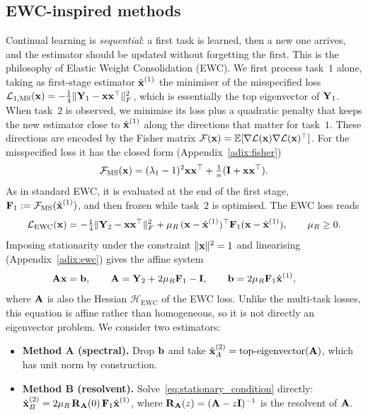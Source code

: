 \subsection{EWC-inspired methods}\label{sec:ewc}
Continual learning is \emph{sequential}: a first task is learned, then a new one arrives, and the estimator should be updated without forgetting the first. This is the philosophy of Elastic Weight Consolidation (EWC). We first process task~$1$ alone, taking as first-stage estimator $\hat{\boldsymbol{\mathbf{x}}}^{(1)}$ the minimiser of the misspecified loss $\mathcal L_{1,\mathrm{MS}}(\boldsymbol{\mathbf{x}}) = -\tfrac14 \|\boldsymbol{\mathbf{Y}}_1 - \boldsymbol{\mathbf{x}}\boldsymbol{\mathbf{x}}^\top \|_F^2$, which is essentially the top eigenvector of $\boldsymbol{\mathbf{Y}}_1$. When task~$2$ is observed, we minimise its loss plus a quadratic penalty that keeps the new estimator close to $\hat{\boldsymbol{\mathbf{x}}}^{(1)}$ along the directions that matter for task~$1$.
These directions are encoded by the Fisher matrix $\mathcal F(\boldsymbol{\mathbf{x}}) = \mathbb E[\nabla\mathcal L(\boldsymbol{\mathbf{x}})\nabla\mathcal L(\boldsymbol{\mathbf{x}})^\top]$. For the misspecified loss it has the closed form (Appendix~\ref{adix:fisher})
\[
    \mathcal F_{\mathrm{MS}}(\boldsymbol{\mathbf{x}}) = (\lambda_1 - 1)^2\boldsymbol{\mathbf{x}}\boldsymbol{\mathbf{x}}^\top + \tfrac1n(\boldsymbol{\mathbf{I}} + \boldsymbol{\mathbf{x}}\boldsymbol{\mathbf{x}}^\top).
\]
As in standard EWC, it is evaluated at the end of the first stage, $\boldsymbol{\mathbf{F}}_1 := \mathcal F_{\mathrm{MS}}(\hat{\boldsymbol{\mathbf{x}}}^{(1)})$, and then frozen while task~$2$ is optimised. The EWC loss reads
\[
    \mathcal L_{\mathrm{EWC}}(\boldsymbol{\mathbf{x}}) = -\tfrac14 \|\boldsymbol{\mathbf{Y}}_2 - \boldsymbol{\mathbf{x}}\boldsymbol{\mathbf{x}}^\top \|_F^2 
    + \mu_R\,(\boldsymbol{\mathbf{x}} - \hat{\boldsymbol{\mathbf{x}}}^{(1)})^\top \boldsymbol{\mathbf{F}}_1 (\boldsymbol{\mathbf{x}} - \hat{\boldsymbol{\mathbf{x}}}^{(1)}),
    \qquad \mu_R \ge 0.
\]
Imposing stationarity under the constraint $ \|\boldsymbol{\mathbf{x}} \|^2 = 1$ and linearising (Appendix~\ref{adix:ewc}) gives the affine system
\begin{equation}
    \boldsymbol{\mathbf{A}}\boldsymbol{\mathbf{x}} = \boldsymbol{\mathbf{b}}, \qquad
    \boldsymbol{\mathbf{A}} = \boldsymbol{\mathbf{Y}}_2 + 2\mu_R \boldsymbol{\mathbf{F}}_1 - \boldsymbol{\mathbf{I}}, \qquad
    \boldsymbol{\mathbf{b}} = 2\mu_R \boldsymbol{\mathbf{F}}_1 \hat{\boldsymbol{\mathbf{x}}}^{(1)}, \qquad
    \label{eq:stationary_condition}
\end{equation}
where $\boldsymbol{\mathbf{A}}$ is also the Hessian $\mathcal H_{\mathrm{EWC}}$ of the EWC loss. Unlike the multi-task losses, this equation is affine rather than homogeneous, so it is not directly an eigenvector problem. We consider two estimators:
\begin{itemize}
    \item \textbf{Method A (spectral).} Drop $\boldsymbol{\mathbf{b}}$ and take
    $\hat{\boldsymbol{\mathbf{x}}}^{(2)}_A = \operatorname{top-eigenvector}(\boldsymbol{\mathbf{A}})$, which has unit norm by construction.
    \item \textbf{Method B (resolvent).} Solve~\eqref{eq:stationary_condition} directly:
        $\hat{\boldsymbol{\mathbf{x}}}^{(2)}_B = 2\mu_R\,\boldsymbol{\mathbf{R}}_{\boldsymbol{\mathbf{A}}}(0)\,\boldsymbol{\mathbf{F}}_1 \hat{\boldsymbol{\mathbf{x}}}^{(1)}$,
    where $\boldsymbol{\mathbf{R}}_{\boldsymbol{\mathbf{A}}}(z) = (\boldsymbol{\mathbf{A}} - z\boldsymbol{\mathbf{I}})^{-1}$ is the resolvent of $\boldsymbol{\mathbf{A}}$.
\end{itemize}

